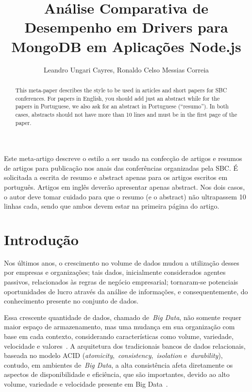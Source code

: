 \documentclass[12pt]{article}
\title{Análise Comparativa de Desempenho em Drivers para MongoDB em Aplicações Node.js}
\author{Leandro Ungari Cayres, Ronaldo Celso Messias Correia }
\begin{document}
 

\maketitle

\begin{abstract}
  This meta-paper describes the style to be used in articles and short papers
  for SBC conferences. For papers in English, you should add just an abstract
  while for the papers in Portuguese, we also ask for an abstract in
  Portuguese (``resumo''). In both cases, abstracts should not have more than
  10 lines and must be in the first page of the paper.
\end{abstract}
     
\begin{resumo} 
  Este meta-artigo descreve o estilo a ser usado na confecção de artigos e
  resumos de artigos para publicação nos anais das conferências organizadas
  pela SBC. É solicitada a escrita de resumo e abstract apenas para os artigos
  escritos em português. Artigos em inglês deverão apresentar apenas abstract.
  Nos dois casos, o autor deve tomar cuidado para que o resumo (e o abstract)
  não ultrapassem 10 linhas cada, sendo que ambos devem estar na primeira
  página do artigo.
\end{resumo}


\section{Introdução}
Nos últimos anos, o crescimento no volume de dados mudou a utilização desses por empresas e organizações; tais dados, inicialmente considerados agentes passivos, relacionados às regras de negócio empresarial; tornaram-se potenciais oportunidades de lucro através da análise de informações, e consequentemente, do conhecimento presente no conjunto de dados.

Essa crescente quantidade de dados, chamado de~\emph{Big Data}, não somente requer maior espaço de armazenamento, mas uma mudança em sua organização com base em cada contexto, considerando características como volume, variedade, velocidade e valores~\cite{ward2013undefined}.
A arquitetura dos tradicionais bancos de dados relacionais, baseada no modelo ACID (\textit{atomicity},~\textit{consistency},~\textit{isolation} e~\textit{durability}), contudo, em ambientes de~\emph{Big Data}, a alta consistência afeta diretamente os aspectos de disponibilidade e  eficiência, que são importantes, devido ao alto volume, variedade e velocidade presente em Big Data~\cite{aparicio:2016}. 
\end{document}
